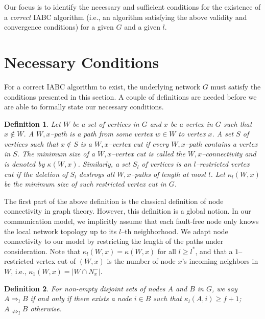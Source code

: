 \documentclass[letterpaper, 11pt]{article}
\newtheorem{definition}{Definition}[section]
\begin{document}
Our focus is to identify the necessary and sufficient
conditions for the existence of a {\em correct} IABC algorithm (i.e.,
an algorithm satisfying the above validity and convergence conditions)
for a given $G$ and a given $l$.






\section{Necessary Conditions}
\label{sec:necessary}

For a correct IABC algorithm to exist, the underlying network $G$ must satisfy the conditions presented in this section. A couple of definitions are needed before we are able to formally state our necessary conditions.

\begin{definition}
Let $W$ be a set of vertices in $G$ and $x$ be a vertex in $G$ such that $x\notin W$. A $W, x$--path is a path from some vertex $w\in W$ to vertex $x$. A set $S$ of vertices such that $x\notin S$ is a $W,x$--\emph{vertex cut} if every $W,x$--path contains a vertex in $S$. The minimum size of a $W,x$--vertex cut is called the $W,x$--connectivity and is denoted by $\kappa(W,x)$. Similarly, a set $S_l$ of vertices is an $l$--\emph{restricted vertex cut} if the deletion of $S_l$ destroys all $W,x$--paths of length at most $l$. Let $\kappa_l(W,x)$ be the minimum size of such restricted vertex cut in $G$.
\end{definition}
The first part of the above definition is the classical definition of node connectivity in graph theory. However, this definition is a global notion. In our communication model, we implicitly assume that each fault-free node only knows the local network topology up to its $l$--th neighborhood. We adapt node connectivity to our model by restricting the length of the paths under consideration. Note that $\kappa_l(W,x)=\kappa(W,x)$ for all $l\ge l^*$, and that a $1$--restricted vertex cut of $(W, x)$ is the number of node $x$'s incoming neighbors in $W$, i.e., $\kappa_1(W,x)=\left|W\cap N_{x}^{-}\right|$.



\begin{definition}
For non-empty disjoint sets of nodes $A$ and $B$ in $G$, we say
 $A\Rightarrow_l B$ if and only if
 there exists a node $i\in B$ such that $\kappa_{l}(A, i)\ge f+1$;
$A\nRightarrow_l B$ otherwise.
\end{definition}
\end{document}
